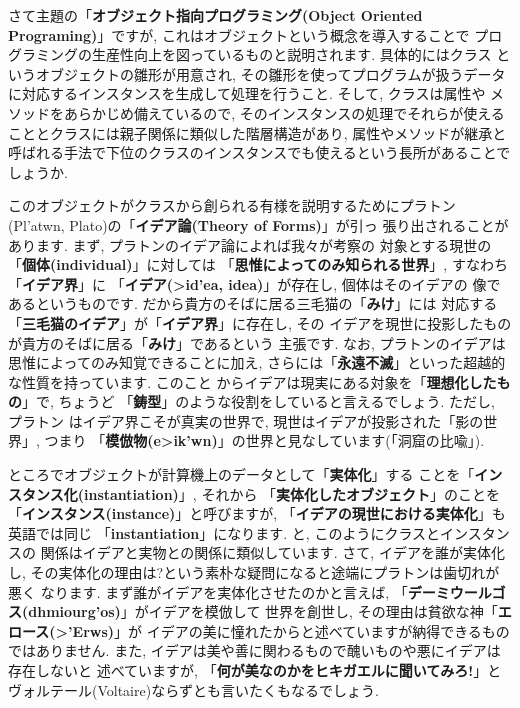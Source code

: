 さて主題の「\textbf{オブジェクト指向プログラミング(Object Oriented
 Programing)}」ですが, これはオブジェクトという概念を導入することで
プログラミングの生産性向上を図っているものと説明されます. 具体的にはクラス
というオブジェクトの雛形が用意され, その雛形を使ってプログラムが扱うデータ
に対応するインスタンスを生成して処理を行うこと. そして, クラスは属性や
メソッドをあらかじめ備えているので, そのインスタンスの処理でそれらが使える
こととクラスには親子関係に類似した階層構造があり, 属性やメソッドが継承と
呼ばれる手法で下位のクラスのインスタンスでも使えるという長所があることで
しょうか.
\newline


このオブジェクトがクラスから創られる有様を説明するためにプラトン
(\textgreek{Pl'atwn}, Plato)の「\textbf{イデア論(Theory of Forms)}」が引っ
張り出されることがあります. まず, プラトンのイデア論によれば我々が考察の
対象とする現世の「\textbf{個体(individual)}」に対しては
「\textbf{思惟によってのみ知られる世界}」, すなわち「\textbf{イデア界}」に
「\textbf{イデア(\textgreek{>id'ea}, idea)}」が存在し, 個体はそのイデアの
像であるというものです. だから貴方のそばに居る三毛猫の「\textbf{みけ}」には
対応する「\textbf{三毛猫のイデア}」が「\textbf{イデア界}」に存在し, その
イデアを現世に投影したものが貴方のそばに居る「\textbf{みけ}」であるという
主張です. なお, プラトンのイデアは思惟によってのみ知覚できることに加え,
 さらには「\textbf{永遠不滅}」といった超越的な性質を持っています. このこと
からイデアは現実にある対象を「\textbf{理想化したもの}」で, ちょうど
「\textbf{鋳型}」のような役割をしていると言えるでしょう. ただし, プラトン
はイデア界こそが真実の世界で, 現世はイデアが投影された「影の世界」, つまり
「\textbf{模倣物(\textgreek{e>ik'wn})}」の世界と見なしています(「洞窟の比喩」\cite{国家}).
\newline


ところでオブジェクトが計算機上のデータとして「\textbf{実体化}」する
ことを「\textbf{インスタンス化(instantiation)}」, それから
「\textbf{実体化したオブジェクト}」のことを
「\textbf{インスタンス(instance)}」と呼びますが, 
「\textbf{イデアの現世における実体化}」も英語では同じ
「\textbf{instantiation}」になります. と, このようにクラスとインスタンスの
関係はイデアと実物との関係に類似しています. さて, イデアを誰が実体化し,
 その実体化の理由は?という素朴な疑問になると途端にプラトンは歯切れが悪く
なります. まず誰がイデアを実体化させたのかと言えば,
 「\textbf{デーミウールゴス(\textgreek{dhmiourg'os})}」がイデアを模倣して
世界を創世し, その理由は貧欲な神「\textbf{エロース(\textgreek{>'Erws})}」が
イデアの美に憧れたからと述べていますが納得できるものではありません.
 また, イデアは美や善に関わるもので醜いものや悪にイデアは存在しないと
述べていますが, 「\textbf{何が美なのかをヒキガエルに聞いてみろ!}」と
ヴォルテール(Voltaire)ならずとも言いたくもなるでしょう.
\newline


